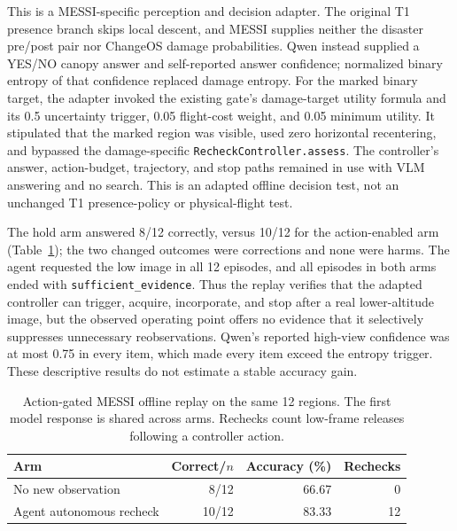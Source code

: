This is a MESSI-specific perception and decision adapter. The original T1 presence branch skips local descent, and MESSI supplies neither the disaster pre/post pair nor ChangeOS damage probabilities. Qwen instead supplied a YES/NO canopy answer and self-reported answer confidence; normalized binary entropy of that confidence replaced damage entropy. For the marked binary target, the adapter invoked the existing gate's damage-target utility formula and its 0.5 uncertainty trigger, 0.05 flight-cost weight, and 0.05 minimum utility. It stipulated that the marked region was visible, used zero horizontal recentering, and bypassed the damage-specific \texttt{RecheckController.assess}. The controller's answer, action-budget, trajectory, and stop paths remained in use with VLM answering and no search. This is an adapted offline decision test, not an unchanged T1 presence-policy or physical-flight test.

The hold arm answered 8/12 correctly, versus 10/12 for the action-enabled arm (Table~\ref{tab:messi-replay}); the two changed outcomes were corrections and none were harms. The agent requested the low image in all 12 episodes, and all episodes in both arms ended with \texttt{sufficient\_evidence}. Thus the replay verifies that the adapted controller can trigger, acquire, incorporate, and stop after a real lower-altitude image, but the observed operating point offers no evidence that it selectively suppresses unnecessary reobservations. Qwen's reported high-view confidence was at most 0.75 in every item, which made every item exceed the entropy trigger. These descriptive results do not estimate a stable accuracy gain.

\begin{table}[htbp]
\centering\small
\caption{Action-gated MESSI offline replay on the same 12 regions. The first model response is shared across arms. Rechecks count low-frame releases following a controller action.}
\label{tab:messi-replay}
\begin{tabular}{lrrr}
\toprule
Arm & Correct/$n$ & Accuracy (\%) & Rechecks\\
\midrule
No new observation & 8/12 & 66.67 & 0\\
Agent autonomous recheck & 10/12 & 83.33 & 12\\
\bottomrule
\end{tabular}
\end{table}

